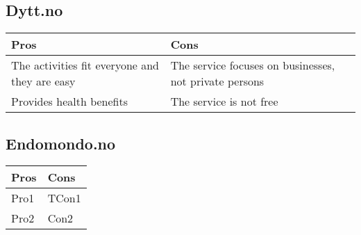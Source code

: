 \subsection{Dytt.no}
\begin{center}
\begin{tabu} to 0.8\textwidth{ |X[l]|X[l]| } 
\hline {}
Pros & Cons \\
\hline
The activities fit everyone and they are easy &
The service focuses on businesses, not private persons \\ 
\hline
Provides health benefits & The service is not free \\ 
\hline
\end{tabu}
\end{center}

\subsection{Endomondo.no}
\begin{center}
\begin{tabu} to 0.8\textwidth{ |X[l]|X[l]| } 
\hline {}
Pros & Cons \\
\hline
Pro1 & 
TCon1 \\ 
\hline
Pro2 & Con2 \\ 
\hline
\end{tabu}
\end{center}

